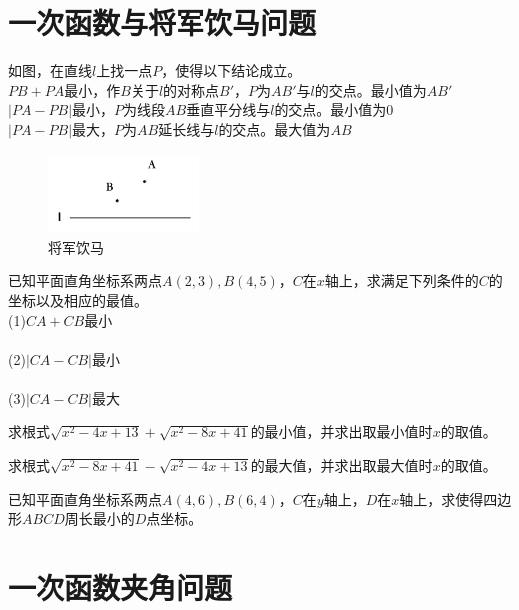 \documentclass{ecnuthesis}
\begin{document}
\section{一次函数与将军饮马问题}
\begin{knowledge}
    如图，在直线$l$上找一点$P$，使得以下结论成立。 \\
    $PB+PA$最小，作$B$关于$l$的对称点$B'$，$P$为$AB'$与$l$的交点。最小值为$AB'$\\
    $|PA-PB|$最小，$P$为线段$AB$垂直平分线与$l$的交点。最小值为0 \\
    $|PA-PB|$最大，$P$为$AB$延长线与$l$的交点。最大值为$AB$ \\
\end{knowledge}
\begin{figure}[ht]
\includegraphics[width=4cm]{picture/4_9_1.png}
\caption{将军饮马}
\end{figure}
\begin{problem}
    已知平面直角坐标系两点$A(2,3),B(4,5)$，$C$在$x$轴上，求满足下列条件的$C$的坐标以及相应的最值。\\
    (1)$CA+CB$最小 \\
    \\
    (2)$|CA-CB|$最小 \\
    \\
    (3)$|CA-CB|$最大 \\
\end{problem}
\begin{problem}
    求根式$\sqrt{x^2-4x+13}+\sqrt{x^2-8x+41}$的最小值，并求出取最小值时$x$的取值。 \\
\end{problem}
\begin{problem}
    求根式$\sqrt{x^2-8x+41}-\sqrt{x^2-4x+13}$的最大值，并求出取最大值时$x$的取值。 \\
\end{problem}
\begin{problem}
    已知平面直角坐标系两点$A(4,6),B(6,4)$，$C$在$y$轴上，$D$在$x$轴上，求使得四边形$ABCD$周长最小的$D$点坐标。\\
\end{problem}

\clearpage
\section{一次函数夹角问题}
\clearpage
\end{document}

